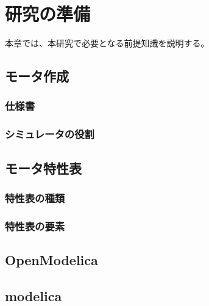 \chapter{研究の準備}\label{cha:Preparation}
本章では、本研究で必要となる前提知識を説明する。

\section{モータ作成}\label{motor}
\subsection{仕様書}\label{siyo}
\subsection{シミュレータの役割}\label{simu}

\section{モータ特性表}\label{toku}
\subsection{特性表の種類}\label{syurui}
\subsection{特性表の要素}\label{element}

\section{OpenModelica}\label{OM}

\section{modelica}\label{modelica}




